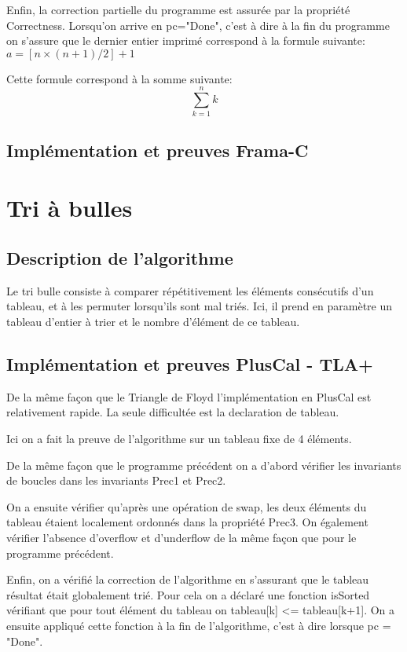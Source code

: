 \documentclass[a4paper,11pt, oneside]{book}
\begin{document}
			Enfin, la correction partielle du programme est assurée par la propriété
			Correctness. Lorsqu'on arrive en pc="Done", c'est à dire à la fin du programme
			on s'assure que le dernier entier imprimé correspond à la formule suivante:
			$a = [n \times (n + 1) / 2] + 1$

			Cette formule correspond à la somme suivante: $$\sum_{k=1}^{n}k$$

		\section{Implémentation et preuves Frama-C}

	\chapter{Tri à bulles}

		\section{Description de l'algorithme}

		Le tri bulle consiste à comparer répétitivement les éléments consécutifs d'un tableau,
		et à les permuter lorsqu'ils sont mal triés. Ici, il prend en paramètre un
		tableau d'entier à trier et le nombre d'élément de ce tableau.


		\section{Implémentation et preuves PlusCal - TLA+}

		De la même façon que le Triangle de Floyd l'implémentation en PlusCal est
		relativement rapide. La seule difficultée est la declaration de tableau.

		Ici on a fait la preuve de l'algorithme sur un tableau fixe de 4 éléments.

		De la même façon que le programme précédent on a d'abord vérifier les invariants
		de boucles dans les invariants Prec1 et Prec2.

		On a ensuite vérifier qu'après une opération de swap, les deux éléments
		du tableau étaient localement ordonnés dans la propriété Prec3. On également
		vérifier l'absence d'overflow et d'underflow de la même façon que pour le programme
		précédent.

		Enfin, on a vérifié la correction de l'algorithme en s'assurant que le tableau
		résultat était globalement trié. Pour cela on a déclaré une fonction isSorted vérifiant
		que pour tout élément du tableau on tableau[k] <= tableau[k+1].
		On a ensuite appliqué cette fonction à la fin de l'algorithme, c'est à dire
		lorsque pc = "Done".
\end{document}
